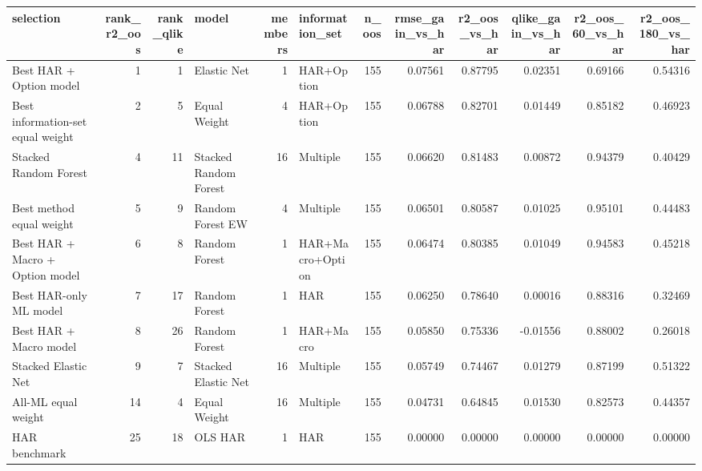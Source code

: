
\begin{tabular}{lrrlrlrrrrrr}
\toprule
selection & rank\_r2\_oos & rank\_qlike & model & members & information\_set & n\_oos & rmse\_gain\_vs\_har & r2\_oos\_vs\_har & qlike\_gain\_vs\_har & r2\_oos\_60\_vs\_har & r2\_oos\_180\_vs\_har\\
\midrule
Best HAR + Option model & 1 & 1 & Elastic Net & 1 & HAR+Option & 155 & 0.07561 & 0.87795 & 0.02351 & 0.69166 & 0.54316\\
Best information-set equal weight & 2 & 5 & Equal Weight & 4 & HAR+Option & 155 & 0.06788 & 0.82701 & 0.01449 & 0.85182 & 0.46923\\
Stacked Random Forest & 4 & 11 & Stacked Random Forest & 16 & Multiple & 155 & 0.06620 & 0.81483 & 0.00872 & 0.94379 & 0.40429\\
Best method equal weight & 5 & 9 & Random Forest EW & 4 & Multiple & 155 & 0.06501 & 0.80587 & 0.01025 & 0.95101 & 0.44483\\
Best HAR + Macro + Option model & 6 & 8 & Random Forest & 1 & HAR+Macro+Option & 155 & 0.06474 & 0.80385 & 0.01049 & 0.94583 & 0.45218\\
\addlinespace
Best HAR-only ML model & 7 & 17 & Random Forest & 1 & HAR & 155 & 0.06250 & 0.78640 & 0.00016 & 0.88316 & 0.32469\\
Best HAR + Macro model & 8 & 26 & Random Forest & 1 & HAR+Macro & 155 & 0.05850 & 0.75336 & -0.01556 & 0.88002 & 0.26018\\
Stacked Elastic Net & 9 & 7 & Stacked Elastic Net & 16 & Multiple & 155 & 0.05749 & 0.74467 & 0.01279 & 0.87199 & 0.51322\\
All-ML equal weight & 14 & 4 & Equal Weight & 16 & Multiple & 155 & 0.04731 & 0.64845 & 0.01530 & 0.82573 & 0.44357\\
HAR benchmark & 25 & 18 & OLS HAR & 1 & HAR & 155 & 0.00000 & 0.00000 & 0.00000 & 0.00000 & 0.00000\\
\bottomrule
\end{tabular}
